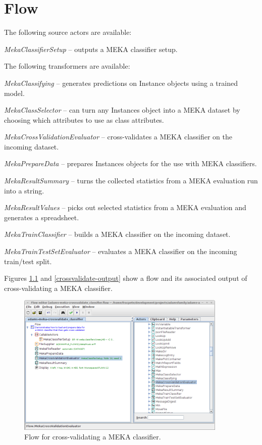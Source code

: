 \documentclass[a4paper]{book}
\begin{document}
\chapter{Flow}
The following source actors are available:
\begin{tight_itemize}
	\item \textit{MekaClassifierSetup} -- outputs a MEKA classifier setup.
\end{tight_itemize}
The following transformers are available:
\begin{tight_itemize}
	\item \textit{MekaClassifying} -- generates predictions on Instance objects
	using a trained model.
	\item \textit{MekaClassSelector} -- can turn any Instances object into
	a MEKA dataset by choosing which attributes to use as class attributes.
	\item \textit{MekaCrossValidationEvaluator} -- cross-validates a MEKA 
	classifier on the incoming dataset.
	\item \textit{MekaPrepareData} -- prepares Instances objects for the 
	use with MEKA classifiers.
	\item \textit{MekaResultSummary} -- turns the collected statistics from
	a MEKA evaluation run into a string.
	\item \textit{MekaResultValues} -- picks out selected statistics from a
	MEKA evaluation and	generates a spreadsheet.
	\item \textit{MekaTrainClassifier} -- builds a MEKA classifier on the
	incoming dataset.
	\item \textit{MekaTrainTestSetEvaluator} -- evaluates a MEKA classifier
	on the incoming train/test split.
\end{tight_itemize}

\newpage
Figures \ref{crossvalidate-flow} and \ref{crossvalidate-output} show a flow
and its associated output of cross-validating a MEKA classifier.

\begin{figure}[htb]
  \centering
  \includegraphics[width=10.0cm]{images/crossvalidate-flow.png}
  \caption{Flow for cross-validating a MEKA classifier.}
  \label{crossvalidate-flow}
\end{figure}
\end{document}
